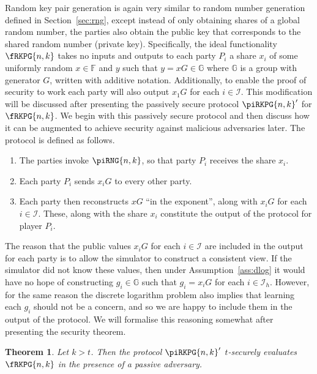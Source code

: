 \documentclass{article}
\newtheorem{theorem}{Theorem}
\theoremstyle{remark}
\newcommand{\F}{\mathbb{F}}
\newcommand{\G}{\mathbb{G}}
\begin{document}
Random key pair generation is again very similar to random number generation
defined in Section~\ref{sec:rng}, except instead of only obtaining shares of a
global random number, the parties also obtain the public key that corresponds
to the shared random number (private key). Specifically, the ideal
functionality $\fRKPG{n,k}$ takes no inputs and outputs to each party $P_i$ a
share $x_i$ of some uniformly random $x \in \F$ and $y$ such that $y = xG \in
\G$ where $\G$ is a group with generator $G$, written with additive notation.
Additionally, to enable the proof of security to work each party will also
output $x_1 G$ for each $i \in \mathcal{I}$. This modification will be
discussed after presenting the passively secure protocol ${\piRKPG{n,k}}'$ for
$\fRKPG{n,k}$. We begin with this passively secure protocol and then discuss
how it can be augmented to achieve security against malicious adversaries
later. The protocol is defined as follows.

\begin{enumerate}
	\item The parties invoke $\piRNG{n,k}$, so that party $P_i$ receives the
		share $x_i$.

	\item\label{enum:rkpgPassBC} Each party $P_i$ sends $x_i G$ to every other
		party.

	\item Each party then reconstructs $xG$ ``in the exponent'', along with
		$x_i G$ for each $i \in \mathcal{I}$. These, along with the share $x_i$
		constitute the output of the protocol for player $P_i$.
\end{enumerate}

The reason that the public values $x_i G$ for each $i \in \mathcal{I}$ are
included in the output for each party is to allow the simulator to construct a
consistent view. If the simulator did not know these values, then under
Assumption~\ref{ass:dlog} it would have no hope of constructing $g_i \in \G$
such that $g_i = x_i G$ for each $i \in \mathcal{I}_h$. However, for the same
reason the discrete logarithm problem also implies that learning each $g_i$
should not be a concern, and so we are happy to include them in the output of
the protocol. We will formalise this reasoning somewhat after presenting the
security theorem.

\begin{theorem}\label{thm:rkpg}
	Let $k > t$. Then the protocol ${\piRKPG{n,k}}'$ $t$-securely evaluates
	$\fRKPG{n,k}$ in the presence of a passive adversary.
\end{theorem}
\end{document}
